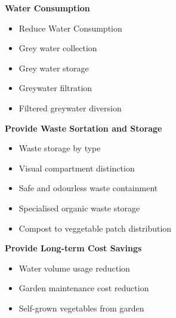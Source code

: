 \documentclass[a4paper,11pt,fleqn]{report}
\begin{document}
\textbf{Water Consumption}
\begin{itemize}
\item Reduce Water Consumption
\item Grey water collection
\item Grey water storage 
\item Greywater filtration 
\item Filtered greywater diversion 
\end{itemize}
\medskip
\textbf{Provide Waste Sortation and Storage}
\begin{itemize}
\item Waste storage by type 
\item Visual compartment distinction 
\item Safe and odourless waste containment 
\item Specialised organic waste storage 
\item Compost to veggetable patch distribution 
\end{itemize}
\medskip
\textbf{Provide Long-term Cost Savings}
\begin{itemize}
\item Water volume usage reduction
\item Garden maintenance cost reduction 
\item Self-grown vegetables from garden
\end{itemize}
\end{document}
